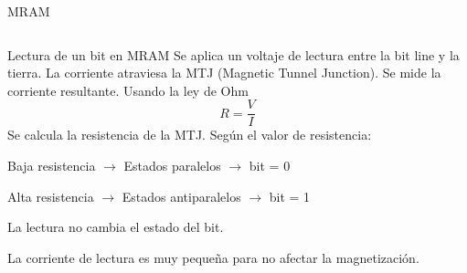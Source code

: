 \documentclass[aspectratio=169]{beamer}
\begin{document}
\begin{frame}{MRAM}
    \begin{columns}
    \end{columns}
\end{frame}

\begin{frame}{Lectura de un bit en MRAM}
Se aplica un voltaje de lectura entre la bit line y la tierra.
La corriente atraviesa la MTJ (Magnetic Tunnel Junction).
Se mide la corriente resultante.
Usando la ley de Ohm 
    \[R = \frac{V}{I}\]
Se calcula la resistencia de la MTJ.
Según el valor de resistencia:

Baja resistencia $\to$ Estados paralelos $\to$ bit = 0

Alta resistencia $\to$ Estados antiparalelos $\to$ bit = 1

La lectura no cambia el estado del bit.

    \alert{La corriente de lectura es muy pequeña para no afectar la magnetización.}
\end{frame}


\begin{frame}[plain]
\end{frame}
\end{document}
